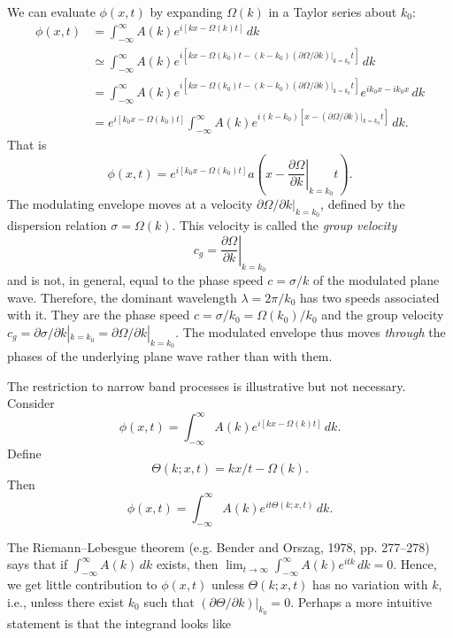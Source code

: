 
We can evaluate $\phi(x,t)$ by expanding $\Omega(k)$ in a Taylor series about $k_0$:
\begin{align*}
	\phi(x,t)
	 & =\int_{-\infty}^{\infty}A(k)e^{i[kx-\Omega(k)t]}\,dk                 \\
	 & \simeq\int_{-\infty}^{\infty}A(k)
	e^{i[kx-\Omega(k_0)t-(k-k_0)(\partial\Omega/\partial k)|_{k=k_0}t]}\,dk \\
	 & =\int_{-\infty}^{\infty}A(k)
	e^{i[kx-\Omega(k_0)t-(k-k_0)(\partial\Omega/\partial k)|_{k=k_0}t]}
	e^{ik_0x-ik_0x}\,dk                                                     \\
	 & =e^{i[k_0x-\Omega(k_0)t]}
	\int_{-\infty}^{\infty}A(k)
	e^{i(k-k_0)[x-(\partial\Omega/\partial k)|_{k=k_0}t]}\,dk.
\end{align*}
That is
\[
	\phi(x,t)=e^{i[k_0x-\Omega(k_0)t]}
	a\left(x-\left.\frac{\partial\Omega}{\partial k}\right|_{k=k_0}t\right).
\]
The modulating envelope moves at a velocity
$\left.\partial\Omega/\partial k\right|_{k=k_0}$, defined by the dispersion relation
$\sigma=\Omega(k)$. This velocity is called the \emph{group velocity}
\[
	c_g=\left.\frac{\partial\Omega}{\partial k}\right|_{k=k_0}
\]
and is not, in general, equal to the phase speed $c=\sigma/k$ of the modulated plane
wave. Therefore, the dominant wavelength $\lambda=2\pi/k_0$ has two speeds associated
with it. They are the phase speed $c=\sigma/k_0=\Omega(k_0)/k_0$ and the group
velocity $c_g=\partial\sigma/\partial k|_{k=k_0}=\partial\Omega/\partial k|_{k=k_0}$.
The modulated envelope thus moves \emph{through} the phases of the underlying plane
wave rather than with them.

The restriction to narrow band processes is illustrative but not necessary. Consider
\[
	\phi(x,t)=\int_{-\infty}^{\infty}A(k)e^{i[kx-\Omega(k)t]}\,dk.
\]
Define
\[
	\Theta(k;x,t)=kx/t-\Omega(k).
\]
Then
\[
	\phi(x,t)=\int_{-\infty}^{\infty}A(k)e^{it\Theta(k;x,t)}\,dk.
\]

\sourcepagebreak

The Riemann--Lebesgue theorem (e.g. Bender and Orszag, 1978, pp. 277--278) says that
if $\int_{-\infty}^{\infty}A(k)\,dk$ exists, then
$\lim_{t\to\infty}\int_{-\infty}^{\infty}A(k)e^{itk}\,dk=0$. Hence, we get little
contribution to $\phi(x,t)$ unless $\Theta(k;x,t)$ has no variation with $k$, i.e.,
unless there exist $k_0$ such that
$\left.(\partial\Theta/\partial k)\right|_{k_0}=0$. Perhaps a more intuitive statement
is that the integrand looks like

